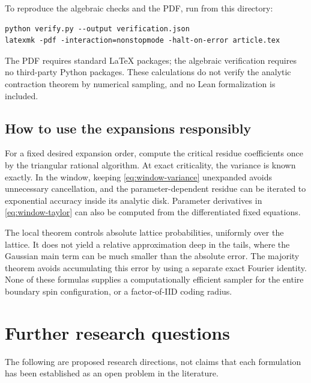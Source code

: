 \documentclass[11pt]{article}
\theoremstyle{definition}
\begin{document}
To reproduce the algebraic checks and the PDF, run from this directory:
\begin{verbatim}
python verify.py --output verification.json
latexmk -pdf -interaction=nonstopmode -halt-on-error article.tex
\end{verbatim}
The PDF requires standard LaTeX packages; the algebraic verification
requires no third-party Python packages. These calculations do not
verify the analytic contraction theorem by numerical sampling, and no
Lean formalization is included.

\subsection{How to use the expansions responsibly}

For a fixed desired expansion order, compute the critical residue
coefficients once by the triangular rational algorithm. At exact
criticality, the variance is known exactly. In the window, keeping
\eqref{eq:window-variance} unexpanded avoids unnecessary cancellation,
and the parameter-dependent residue can be iterated to exponential
accuracy inside its analytic disk. Parameter derivatives in
\eqref{eq:window-taylor} can also be computed from the differentiated
fixed equations.

The local theorem controls absolute lattice probabilities, uniformly
over the lattice. It does not yield a relative approximation deep in
the tails, where the Gaussian main term can be much smaller than the
absolute error. The majority theorem avoids accumulating this error
by using a separate exact Fourier identity. None of these formulas
supplies a computationally efficient sampler for the entire boundary
spin configuration, or a factor-of-IID coding radius.

\section{Further research questions}

The following are proposed research directions, not claims that each
formulation has been established as an open problem in the literature.
\end{document}
